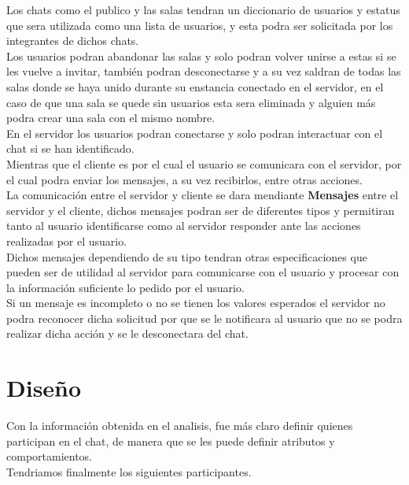 \documentclass[12pt]{report}
\begin{document}
Los chats como el publico y las salas tendran un diccionario de usuarios y estatus que sera utilizada como una lista de usuarios, y esta podra ser solicitada por los integrantes de dichos chats.\\

Los usuarios podran abandonar las salas y solo podran volver unirse a estas si se les vuelve a invitar, también podran desconectarse y a su vez saldran de todas las salas donde se haya unido durante su enstancia conectado en el servidor, en el caso de que una sala se quede sin usuarios esta sera eliminada y alguien más podra crear una sala con el mismo nombre.\\

En el servidor los usuarios podran conectarse y solo podran interactuar con el chat si se han identificado.\\

Mientras que el cliente es por el cual el usuario se comunicara con el servidor, por el cual podra enviar los mensajes, a su vez recibirlos, entre otras acciones.\\

La comunicación entre el servidor y cliente se dara mendiante \textbf{Mensajes} entre el servidor y el cliente, dichos mensajes podran ser de diferentes tipos y permitiran tanto al usuario identificarse como al servidor responder ante las acciones realizadas por el usuario.\\

Dichos mensajes dependiendo de su tipo tendran otras especificaciones que pueden ser de utilidad al servidor para comunicarse con el usuario y procesar con la información suficiente lo pedido por el usuario.\\

Si un mensaje es incompleto o no se tienen los valores esperados el servidor no podra reconocer dicha solicitud por que se le notificara al usuario que no se podra realizar dicha acción y se le desconectara del chat.\\

\section{Diseño}
Con la información obtenida en el analisis, fue más claro definir quienes participan en el chat, de manera que se les puede definir atributos y comportamientos.\\

Tendriamos finalmente los siguientes participantes.\\
\end{document}
